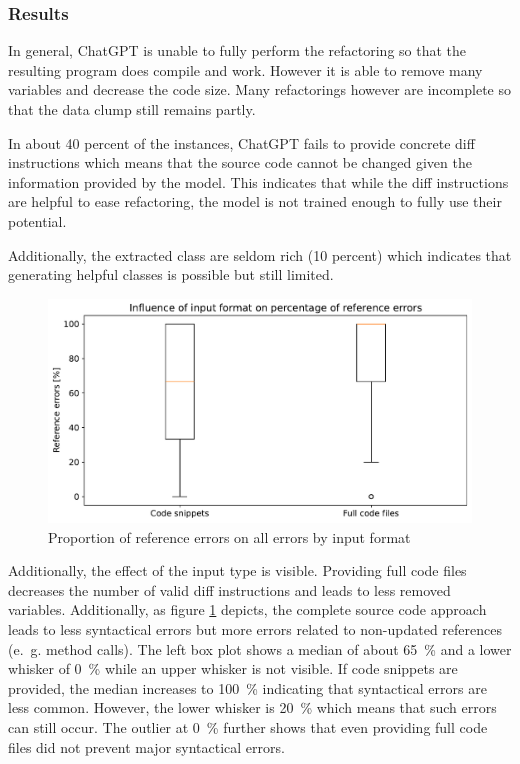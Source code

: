 \subsubsection{Results}

In general, ChatGPT is unable to fully perform the refactoring so that the resulting program does compile and work. However it is able to remove many variables and decrease the code size. Many refactorings however are incomplete so that the data clump still remains partly. 

In about 40 percent of the instances, ChatGPT fails to provide concrete diff instructions which means that the source code cannot be changed given the information provided by the model. This indicates that while the diff instructions are helpful to ease refactoring, the model is not trained enough to fully use their potential. 

Additionally, the extracted class are seldom rich (10 percent) which indicates that generating helpful classes is possible but still limited. 
\begin{figure}
    \centering
    \includegraphics[width=\columnwidth]{figures/chapter5/refactor_input_referenceerrors.pdf}
    \caption{Proportion of reference errors on all errors by input format}
    \label{fig:refactor_input_referenceerrors}
\end{figure}




Additionally, the effect of the input type is visible. Providing full code files decreases the number of valid diff instructions and leads to less removed variables.  Additionally, as figure \ref{fig:refactor_input_referenceerrors} depicts, the complete source code approach leads to less syntactical errors but more errors related to non-updated references (e.~g. method calls).  The left box plot shows a median of about 65~\% and a lower whisker of 0~\% while an upper whisker is not visible. If code snippets are provided, the median increases to 100~\% indicating that syntactical errors are less common. However, the lower whisker is 20~\% which means that such errors can still occur. The outlier at 0~\% further shows that even providing full code files did not prevent major syntactical errors. 


